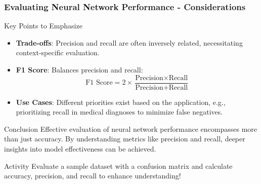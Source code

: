 \documentclass[aspectratio=169]{beamer}
\begin{document}
\begin{frame}[fragile]
    \frametitle{Evaluating Neural Network Performance - Considerations}
    \begin{block}{Key Points to Emphasize}
        \begin{itemize}
            \item \textbf{Trade-offs}: Precision and recall are often inversely related, necessitating context-specific evaluation.
            \item \textbf{F1 Score}: Balances precision and recall:
            \begin{equation}
                \text{F1 Score} = 2 \times \frac{\text{Precision} \times \text{Recall}}{\text{Precision} + \text{Recall}} 
            \end{equation}
            \item \textbf{Use Cases}: Different priorities exist based on the application, e.g., prioritizing recall in medical diagnoses to minimize false negatives.
        \end{itemize}
    \end{block}

    \begin{block}{Conclusion}
        Effective evaluation of neural network performance encompasses more than just accuracy. By understanding metrics like precision and recall, deeper insights into model effectiveness can be achieved.
    \end{block}
    
    \begin{block}{Activity}
        Evaluate a sample dataset with a confusion matrix and calculate accuracy, precision, and recall to enhance understanding!
    \end{block}
\end{frame}
\end{document}
